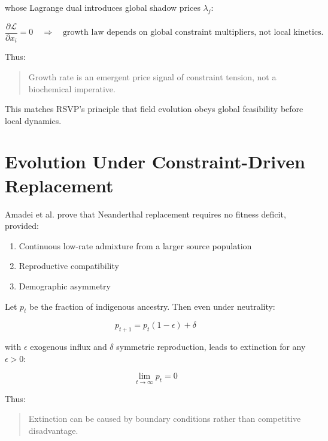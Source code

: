 \documentclass[11pt,a4paper]{article}
\begin{document}
whose Lagrange dual introduces global shadow prices $\lambda_j$:

\begin{equation}
\frac{\partial \mathcal{L}}{\partial x_i} = 0 \quad \Rightarrow \quad
\text{growth law depends on global constraint multipliers, not local kinetics.}
\end{equation}

Thus:

\begin{quote}
Growth rate is an emergent price signal of constraint tension, not a biochemical imperative.
\end{quote}

This matches RSVP’s principle that field evolution obeys global feasibility before local dynamics.

\section{Evolution Under Constraint-Driven Replacement}

Amadei et al. \citeyearpar{Amadei2025} prove that Neanderthal replacement requires no fitness deficit, provided:

\begin{enumerate}
    \item Continuous low-rate admixture from a larger source population
    \item Reproductive compatibility
    \item Demographic asymmetry
\end{enumerate}

Let $p_t$ be the fraction of indigenous ancestry. Then even under neutrality:

\begin{equation}
p_{t+1} = p_t(1 - \epsilon) + \delta
\end{equation}

with $\epsilon$ exogenous influx and $\delta$ symmetric reproduction, leads to extinction for any $\epsilon > 0$:

\begin{equation}
\lim_{t \to \infty} p_t = 0
\end{equation}

Thus:

\begin{quote}
Extinction can be caused by boundary conditions rather than competitive disadvantage.
\end{quote}
\end{document}
